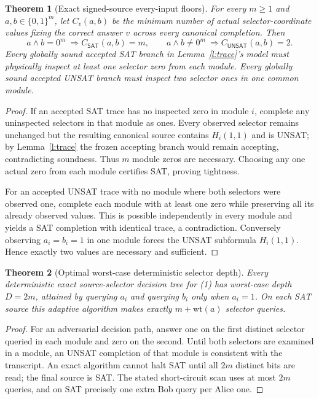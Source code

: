 \documentclass[11pt]{article}
\newtheorem{theorem}{Theorem}
\newcommand{\SAT}{\mathsf{SAT}}
\newcommand{\UNSAT}{\mathsf{UNSAT}}
\begin{document}
\begin{theorem}[Exact signed-source every-input floors]\label{t:floor}
For every $m\ge1$ and $a,b\in\{0,1\}^m$, let $C_v(a,b)$
be the minimum number of actual selector-coordinate
values fixing the correct answer $v$ across every
canonical completion. Then
\[
\boxed{
a\wedge b=0^m\ \Longrightarrow C_{\SAT}(a,b)=m,\qquad
a\wedge b\ne0^m\ \Longrightarrow C_{\UNSAT}(a,b)=2.
} \tag{2}
\]
Every globally sound accepted SAT branch in
Lemma~\ref{l:trace}'s model must physically inspect at
least one selector \emph{zero} from each module.
Every globally sound accepted UNSAT branch must
inspect two selector \emph{ones} in one common module.
\end{theorem}
\begin{proof}
If an accepted SAT trace has no inspected zero in module
$i$, complete any uninspected selectors in that module
as ones. Every observed selector remains unchanged but
the resulting canonical source contains $H_i(1,1)$ and
is UNSAT; by Lemma~\ref{l:trace} the frozen accepting
branch would remain accepting, contradicting soundness.
Thus $m$ module zeros are necessary. Choosing any one
actual zero from each module certifies SAT, proving tightness.

For an accepted UNSAT trace with no module where both
selectors were observed one, complete each module with
at least one zero while preserving all its already observed
values. This is possible independently in every module
and yields a SAT completion with identical trace, a
contradiction. Conversely observing $a_i=b_i=1$
in one module forces the UNSAT subformula $H_i(1,1)$.
Hence exactly two values are necessary and sufficient.
\end{proof}

\begin{theorem}[Optimal worst-case deterministic selector depth]
Every deterministic exact source-selector decision tree
for (1) has worst-case depth $D=2m$, attained by
querying $a_i$ and querying $b_i$ only when $a_i=1$.
On each SAT source this adaptive algorithm makes
exactly $m+\mathrm{wt}(a)$ selector queries.
\end{theorem}
\begin{proof}
For an adversarial decision path, answer one on the first
distinct selector queried in each module and zero on the
second. Until both selectors are examined in a module,
an UNSAT completion of that module is consistent with
the transcript. An exact algorithm cannot halt SAT until
all $2m$ distinct bits are read; the final source is SAT.
The stated short-circuit scan uses at most $2m$ queries,
and on SAT precisely one extra Bob query per Alice one.
\end{proof}
\end{document}
